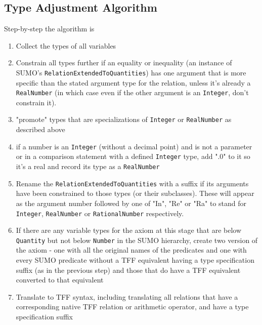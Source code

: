 \documentclass{article}
\begin{document}
\subsection{Type Adjustment Algorithm}

Step-by-step the algorithm is

\begin{enumerate}

\item \label{alg1:vartype} Collect the types of all variables

\item \label{alg1:constrain} Constrain all types further if an equality or
inequality (an instance of SUMO's \texttt{RelationExtendedToQuantities}) has one
argument that is more specific than the stated argument type for the relation,
unless it's already a \texttt{RealNumber} (in which case even if the other
argument is an \texttt{Integer}, don't constrain it).

\item \label{alg1:promote} "promote" types that are specializations of
\texttt{Integer} or \texttt{RealNumber} as described above

\item \label{alg1:modint} if a number is an \texttt{Integer} (without a decimal
point) and is not a parameter or in a comparison statement with a defined
\texttt{Integer} type, add
".0" to it so it's a real and record its type as a \texttt{RealNumber}

\item \label{alg1:rename} Rename the \texttt{RelationExtendedToQuantities} with a
suffix if its arguments have been
constrained to those types (or their subclasses).  These will appear as the argument
number followed by one of "In", "Re" or "Ra" to stand for \texttt{Integer},
\texttt{RealNumber} or \texttt{RationalNumber} respectively.

\item \label{alg1:double} If there are any variable types for the axiom at this stage
that are below \texttt{Quantity} but not below \texttt{Number} in the SUMO
hierarchy, create two version of the axiom - one with all the original names of
the predicates and one with every SUMO predicate without a TFF equivalent having
a type specification suffix (as in the previous step) and those that do have a TFF 
equivalent converted to
that equivalent

\item \label{alg1:TFF} Translate to TFF syntax, including translating all relations
that have a corresponding native TFF relation or arithmetic operator, and have a
type specification suffix

\end{enumerate}
\end{document}
